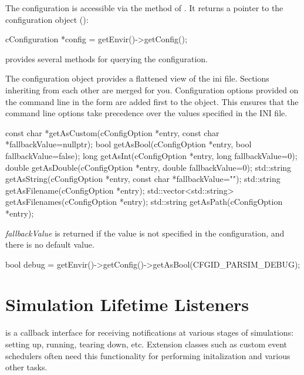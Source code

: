 The configuration is accessible via the  method of .
It returns a pointer to the configuration object ():

\begin{cpp}
cConfiguration *config = getEnvir()->getConfig();
\end{cpp}

 provides several methods for querying the configuration.

\begin{note}
The configuration object provides a flattened view of the ini file. Sections
inheriting from each other are merged for you. Configuration options provided
on the command line in the form  are added first to the object.
This ensures that the command line options take precedence over the values specified
in the INI file.
\end{note}

\begin{cpp}
const char *getAsCustom(cConfigOption *entry, const char *fallbackValue=nullptr);
bool getAsBool(cConfigOption *entry, bool fallbackValue=false);
long getAsInt(cConfigOption *entry, long fallbackValue=0);
double getAsDouble(cConfigOption *entry, double fallbackValue=0);
std::string getAsString(cConfigOption *entry, const char *fallbackValue="");
std::string getAsFilename(cConfigOption *entry);
std::vector<std::string> getAsFilenames(cConfigOption *entry);
std::string getAsPath(cConfigOption *entry);
\end{cpp}

\textit{fallbackValue} is returned if the value is not specified in the configuration,
and there is no default value.

\begin{cpp}
bool debug = getEnvir()->getConfig()->getAsBool(CFGID_PARSIM_DEBUG);
\end{cpp}


\section{Simulation Lifetime Listeners}
\label{sec:plugin-exts:simulation-lifetime-listeners}

 is a callback interface for
receiving notifications at various stages of simulations: setting up,
running, tearing down, etc. Extension classes such as custom event
schedulers often need this functionality for performing initalization
and various other tasks.

